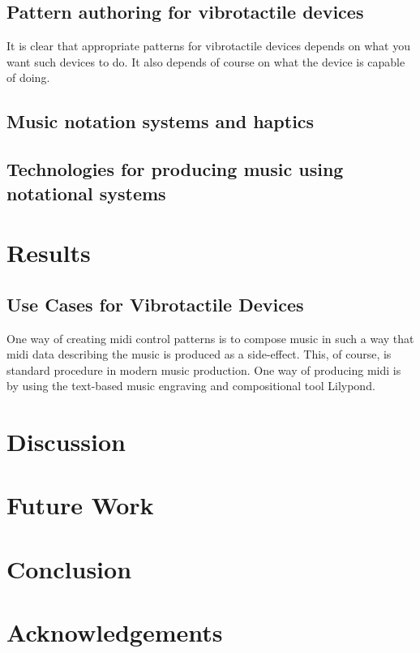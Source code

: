 \documentclass[a4paper, twocolumn]{article}
\begin{document}
\subsection{Pattern authoring for vibrotactile devices}
It is clear that appropriate patterns for vibrotactile devices depends on what you want such devices to do. It also depends of course on what the device is capable of doing. 

\subsection{Music notation systems and haptics}
\subsection{Technologies for producing music using notational systems}

\section{Results}
\subsection{Use Cases for Vibrotactile Devices}
One way of creating midi control patterns is to compose music in such a way that midi data describing the music is produced as a side-effect. This, of course, is standard procedure in modern music production. One way of producing midi is by using the text-based music engraving and compositional tool Lilypond.
\section{Discussion}
\section{Future Work}
\section{Conclusion}
\section{Acknowledgements}




  
\end{document}
